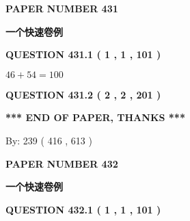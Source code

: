 \documentclass{ctexart}
\begin{document}
   
 {\textbf{ \Large{ PAPER NUMBER  431  }}}
   
   
\vspace{0.2in}
   
   
   
   
   
   
 \vspace{0.2in}
{\LARGE {\textbf{ 一个快速卷例}}}
   
   
  
\vspace{0.2in}
  
{\textbf{\Large{QUESTION
431.1 
 ( 1 , 1 , 101 )
}}}
  
  
 
 

$ %
46 +  %
54=   %
100$
 
 
  
\vspace{0.2in}
  
{\textbf{\Large{QUESTION
431.2 
 ( 2 , 2 , 201 )
}}}
  
  
   
   
 \vspace{0.2in}
 
   
   
   
   
\vspace{1.0in} 
{\textbf{\large{ *** END OF PAPER, THANKS *** }}} 
   
   
\hspace{1.0in} By: 
 239 ( 416 ,  613 )
   
   
   
   
\newpage 
\setcounter{page}{ 
   432001 } 
   
   
   
   
 {\textbf{ \Large{ PAPER NUMBER  432  }}}
   
   
\vspace{0.2in}
   
   
   
   
   
   
 \vspace{0.2in}
{\LARGE {\textbf{ 一个快速卷例}}}
   
   
  
\vspace{0.2in}
  
{\textbf{\Large{QUESTION
432.1 
 ( 1 , 1 , 101 )
}}}
  
\end{document}
